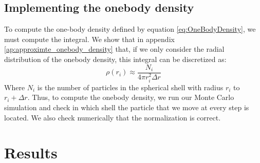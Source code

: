 \documentclass[a4paper, 10pt]{article}
\begin{document}
	\subsection{Implementing the onebody density}\label{sec:MetOneBody}
	To compute the one-body density defined by equation \ref{eq:OneBodyDensity}, we must compute the integral. We show that in appendix \ref{ap:approximte_onebody_density} that, if we only consider the radial distribution of the onebody density, this integral can be discretized as:
	\begin{equation}
		\rho(r_i)\approx \frac{N_i}{4\pi r_i^2 \Delta r}
		\end{equation}
		Where $N_i$ is the number of particles in the spherical shell with radius $r_i$ to $r_i+\Delta r$. Thus, to compute the onebody density, we run our Monte Carlo simulation and check in which shell the particle that we move at every step is located. We also check numerically that the normalization is correct.
	
	\section{Results}
\end{document}
